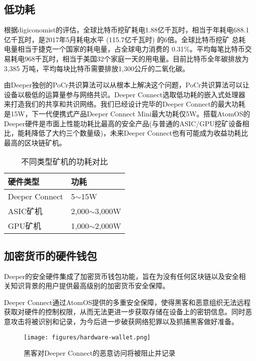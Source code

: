\documentclass[a4paper]{article}
\begin{document}
\subsection{低功耗}
根据digiconomist的评估\cite{bitcoin-energy-consumption}，全球比特币挖矿耗电1.88亿千瓦时，相当于年耗电688.1亿千瓦时，是2017年5月耗电水平 (115.7亿千瓦时) 的6倍。全球比特币挖矿
总耗电量相当于捷克一个国家的耗电量，占全球电力消费的 0.31\%。平均每笔比特币交易耗电968千瓦时，相当于美国32个家庭一天的用电量。目前比特币全年碳排放为3,385 万吨，平均每块比特币需要排放1,300公斤的二氧化碳\cite{bitcoin-energy-consumption2}。

由Deeper独创的PoCr共识算法可以从根本上解决这个问题，PoCr共识算法可以让设备以极低的运算量参与网络共识。Deeper Connect选取低功耗的嵌入式处理器来打造我们的共享和共识网络。我们已经设计完毕的Deeper Connect的最大功耗是15W，下一代便携式产品Deeper Connect Mini最大功耗仅5W。搭载AtomOS的Deeper硬件是市面上性能功耗比最高的安全产品(与普通的ASIC/GPU挖矿设备相比，能耗降低了大约三个数量级)，未来Deeper Connect也有可能成为收益功耗比最高的区块链矿机。

\begin{table} [hh]
\centering
\begin{tabular}{|l|l|}
\hline
硬件类型 & 功耗 \\ \hline
Deeper Connect & 5$\sim$15W \\ \hline
ASIC矿机 & 2,000$\sim$3,000W \\ \hline
GPU矿机 & 1,000$\sim$2,000W \\ \hline
\end{tabular}
\caption{不同类型矿机的功耗对比} 
\label{tab:power}
\end{table}

\subsection{加密货币的硬件钱包}
Deeper的安全硬件集成了加密货币钱包功能，旨在为没有任何区块链以及安全相关知识背景的用户提供最高级别的加密货币安全保障。

Deeper Connect通过AtomOS提供的多重安全保障，使得黑客和恶意组织无法远程获取对硬件的控制权限，从而无法更进一步获取存储在设备上的密钥信息。同时恶意攻击将被识别和记录，为今后进一步破获网络犯罪以及抓捕黑客做好准备。

\begin{figure}[hhhh]
\centering
\texttt{[image: figures/hardware-wallet.png]}
\caption{黑客对Deeper Connect的恶意访问将被阻止并记录}
\label{fig:hardware-wallet}
\end{figure}
\end{document}
